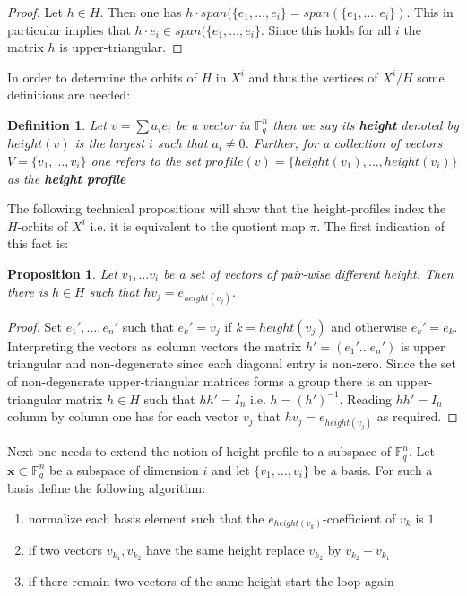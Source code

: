 \documentclass[11pt]{amsart}
\newtheorem{proposition}[theorem]{Proposition}
\newtheorem{definition}[theorem]{Definition}
\begin{document}
    \begin{proof}
        Let $h\in H$. Then one has $h \cdot span(\{e_1,\dots, e_i\}=span(\{e_1,\dots, e_i\})$. This in particular implies that $h\cdot e_i\in span(\{e_1,\dots, e_i\}$. Since this holds for all $i$ the matrix $h$ is upper-triangular. 
    \end{proof}
    In order to determine the orbits of $H$ in $X^i$ and thus the vertices of $X^i/H$ some definitions are needed:
    \begin{definition}
        Let $v=\sum a_ie_i$ be a vector in $\mathbb{F}_q^n$ then we say its \textbf{height} denoted by $height(v)$ is the largest $i$ such that $a_i\neq 0$. Further, for a collection of vectors $V=\{v_1,\dots, v_i\}$ one refers to the set $profile(v)=\{height(v_1),\dots, height(v_i)\}$ as the \textbf{height profile}
        \label{def:Heights}
    \end{definition}
    The following technical propositions will show that the height-profiles index the $H$-orbits of $X^i$ i.e. it is equivalent to the quotient map $\pi$. The first indication of this fact is: 
    \begin{proposition}
        Let $v_1,\dots v_i$ be a set of vectors of pair-wise different height. Then there is $h\in H$ such that $hv_j=e_{height(v_j)}$.
        \label{prop:SortHeights}
    \end{proposition}
    \begin{proof}
        Set $e_1',\dots, e_n'$ such that $e_k'=v_j$ if $k=height(v_j)$ and otherwise $e_k'=e_k$. Interpreting the vectors as column vectors the matrix $h'=(e_1'\dots e_n')$ is upper triangular and non-degenerate since each diagonal entry is non-zero. Since the set of non-degenerate upper-triangular matrices forms a group there is an upper-triangular matrix $h\in H$ such that $hh'=I_n$ i.e. $h=(h')^{-1}$. Reading $hh'=I_n$ column by column one has for each vector $v_j$ that $hv_j=e_{height(v_j)}$ as required. 
    \end{proof}
    Next one needs to extend the notion of height-profile to a subspace of $\mathbb{F}_q^n$. Let $\textbf{x}\subset \mathbb{F}_q^n$ be a subspace of dimension $i$ and let $\{v_1,\dots, v_i\}$ be a basis. For such a basis define the following algorithm:
    \begin{enumerate}
        \item normalize each basis element such that the $e_{height(v_k)}$-coefficient of $v_k$ is $1$
        \item if two vectors $v_{k_1}, v_{k_2}$ have the same height replace $v_{k_2}$ by $v_{k_2}-v_{k_1}$
        \item if there remain two vectors of the same height start the loop again
    \end{enumerate}
\end{document}
